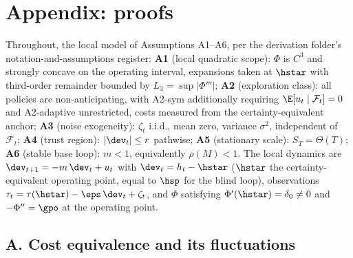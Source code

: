 \documentclass[11pt]{article}
\begin{document}
\section*{Appendix: proofs}


Throughout, the local model of Assumptions A1--A6, per the derivation
folder's notation-and-assumptions register:
\textbf{A1} (local quadratic scope): $\Phi$ is $C^3$ and strongly concave
on the operating interval, expansions taken at $\hstar$ with third-order
remainder bounded by $L_3 = \sup|\Phi'''|$;
\textbf{A2} (exploration class): all policies are non-anticipating, with
A2-sym additionally requiring $\E[u_t \mid \mathcal{F}_t] = 0$ and
A2-adaptive unrestricted, costs measured from the certainty-equivalent
anchor;
\textbf{A3} (noise exogeneity): $\zeta_t$ i.i.d., mean zero, variance
$\sigma^2$, independent of $\mathcal{F}_t$;
\textbf{A4} (trust region): $|\dev_t| \le r$ pathwise;
\textbf{A5} (stationary scale): $S_T = \Theta(T)$;
\textbf{A6} (stable base loop): $m < 1$, equivalently $\rho(M) < 1$.
The local dynamics are $\dev_{t+1} = -m\,\dev_t + u_t$ with
$\dev_t = h_t - \hstar$ ($\hstar$ the certainty-equivalent operating
point, equal to $\hsp$ for the blind loop), observations
$\tau_t = \tau(\hstar) - \eps\,\dev_t + \zeta_t$, and $\Phi$ satisfying
$\Phi'(\hstar) = \delta_0 \neq 0$ and $-\Phi'' = \gpo$ at the operating
point.

\subsection*{A. Cost equivalence and its fluctuations}
\end{document}
